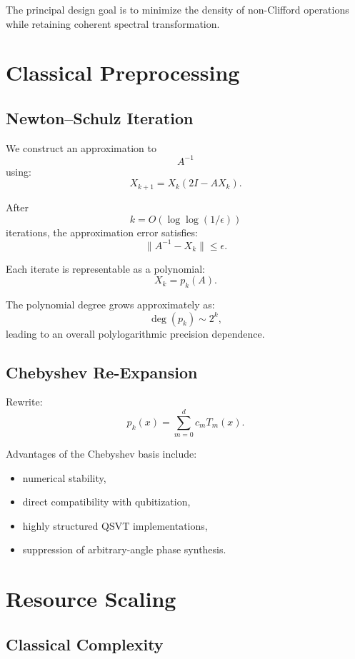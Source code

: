 \documentclass[12pt,a4paper]{article}
\begin{document}
The principal design goal is to minimize the density of non-Clifford operations while retaining coherent spectral transformation.


\section{Classical Preprocessing}

\subsection{Newton--Schulz Iteration}

We construct an approximation to
\[
A^{-1}
\]
using:
\[
X_{k+1}
=
X_k(2I-AX_k).
\]

After
\[
k = O(\log\log(1/\epsilon))
\]
iterations, the approximation error satisfies:
\[
\|A^{-1}-X_k\|
\le
\epsilon.
\]

Each iterate is representable as a polynomial:
\[
X_k = p_k(A).
\]

The polynomial degree grows approximately as:
\[
\deg(p_k)
\sim
2^k,
\]
leading to an overall polylogarithmic precision dependence.

\subsection{Chebyshev Re-Expansion}

Rewrite:
\[
p_k(x)
=
\sum_{m=0}^{d} c_m T_m(x).
\]

Advantages of the Chebyshev basis include:

\begin{itemize}
    \item numerical stability,
    \item direct compatibility with qubitization,
    \item highly structured QSVT implementations,
    \item suppression of arbitrary-angle phase synthesis.
\end{itemize}


\section{Resource Scaling}

\subsection{Classical Complexity}
\end{document}
